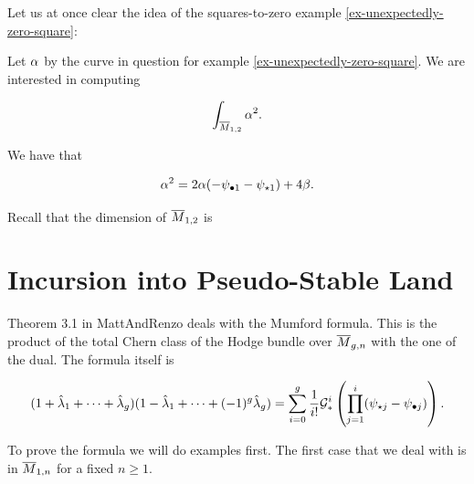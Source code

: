 \documentclass[12pt]{memoir}
\begin{document}
Let us at once clear the idea of the squares-to-zero example \ref{ex-unexpectedly-zero-square}:

\begin{Ex}
    Let \(\alpha\) by the curve in question for example \ref{ex-unexpectedly-zero-square}. We are interested in computing

    \[\int_{\overline{M}_{1,2}}\alpha^2.\]

    We have that

    \[\alpha^2=2\alpha(-\psi_{\bullet1}-\psi_{\star1})+4\beta.\]

    Recall that the dimension of \(\overline{M}_{1,2}\) is
\end{Ex}
\section{Incursion into Pseudo-Stable Land}

Theorem 3.1 in MattAndRenzo \cite{MattAndRenzo} deals with the Mumford formula. This is the product of the total Chern class of the Hodge bundle over \(\overline{M}_{g,n}\) with the one of the dual. The formula itself is

\[(1+\hat{\lambda}_1+\dots+\hat{\lambda}_g)(1-\hat{\lambda}_1+\dots+(-1)^g\hat{\lambda}_g)=\sum_{i=0}^g\frac{1}{i!}\mathcal{G}_\ast^i\left(\prod_{j=1}^i(\psi_{\star j}-\psi_{\bullet j})\right).\]


To prove the formula we will do examples first. The first case that we deal with is in \(\overline M_{1,n}\) for a fixed \(n\geq 1\).
\end{document}
